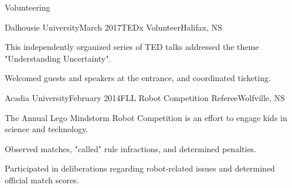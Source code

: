 \documentclass{resume} %
\begin{document}
\begin{rSection}{Volunteering}


\begin{rSubsection}{Dalhousie University}{March 2017}{TEDx Volunteer}{Halifax, NS}

\item[] This independently organized series of TED talks addressed the theme "Understanding Uncertainty".\smallskip


\item Welcomed guests and speakers at the entrance, and coordinated ticketing.
\end{rSubsection}

\begin{rSubsection}{Acadia University}{February 2014}{FLL Robot Competition Referee}{Wolfville, NS}

\item[] The Annual Lego Mindstorm Robot Competition is an effort to engage kids in science and technology.\smallskip

\item Observed matches, "called" rule infractions, and determined penalties. 
\item Participated in deliberations regarding robot-related issues and determined official match scores.
\end{rSubsection}

\end{rSection}


\end{document}
